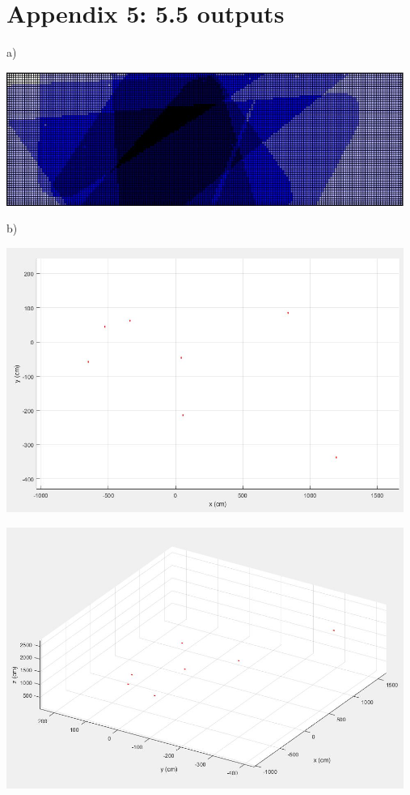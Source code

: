 \documentclass[12pt]{report}
\begin{document}
\section*{Appendix 5: 5.5 outputs}

a)


\includegraphics[width=130mm]{./images/appendix/CameraOverlapIllustration.JPG}

b)


\includegraphics[width=130mm]{./images/appendix/MATLABPlot.JPG}

\includegraphics[width=130mm]{./images/appendix/MATLABPlot2.JPG}
\end{document}
